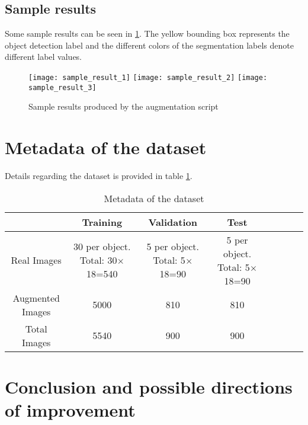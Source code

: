 \documentclass[paper=a4,11pt,parskip=half,toc=listof]{scrartcl}
\begin{document}
\subsection{Sample results}
Some sample results can be seen in \ref{Fig:8}. The yellow bounding box represents the object detection label and the different colors of the segmentation labels denote different label values.

	\begin{figure}[htb!]
		\centering
		\texttt{[image: sample\_result\_1]}
		\texttt{[image: sample\_result\_2]}
		\texttt{[image: sample\_result\_3]}
		\caption{Sample results produced by the augmentation script}
		\label{Fig:8}
	\end{figure}
	

\section{Metadata of the dataset}

Details regarding the dataset is provided in table \ref{Table:3}.

\begin{table}[!htb]
\centering
\begin{tabular}{|c|c|c|c|c|c|c|c|}
\hline 
    & Training & Validation & Test \\ 
\hline 
Real Images & \makecell{30 per object.\\ Total: 30$\times$18=540} & \makecell{5 per object.\\ Total: 5$\times$18=90} & \makecell{5 per object.\\ Total: 5$\times$18=90} \\ 
\hline 
Augmented Images & 5000 & 810 & 810 \\ 
\hline 
Total Images & 5540 & 900 & 900 \\ 
\hline 
\end{tabular}
\caption{Metadata of the dataset} 
\label{Table:3}
\end{table}

\section{Conclusion and possible directions of improvement}
\end{document}

